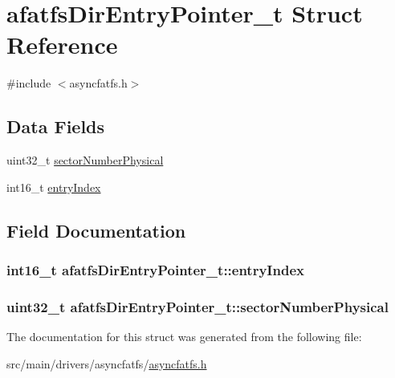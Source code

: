 \hypertarget{structafatfsDirEntryPointer__t}{\section{afatfs\+Dir\+Entry\+Pointer\+\_\+t Struct Reference}
\label{structafatfsDirEntryPointer__t}
}


{\ttfamily \#include $<$asyncfatfs.\+h$>$}

\subsection*{Data Fields}
\begin{DoxyCompactItemize}
\item 
uint32\+\_\+t \hyperlink{structafatfsDirEntryPointer__t_a5700be08a1c9a36c105ca3d246e9b5f3}{sector\+Number\+Physical}
\item 
int16\+\_\+t \hyperlink{structafatfsDirEntryPointer__t_a9eae6ef6291f42cfe22a848f3e6ca11d}{entry\+Index}
\end{DoxyCompactItemize}


\subsection{Field Documentation}
\hypertarget{structafatfsDirEntryPointer__t_a9eae6ef6291f42cfe22a848f3e6ca11d}{
\subsubsection[{entry\+Index}]{\setlength{\rightskip}{0pt plus 5cm}int16\+\_\+t afatfs\+Dir\+Entry\+Pointer\+\_\+t\+::entry\+Index}}\label{structafatfsDirEntryPointer__t_a9eae6ef6291f42cfe22a848f3e6ca11d}
\hypertarget{structafatfsDirEntryPointer__t_a5700be08a1c9a36c105ca3d246e9b5f3}{
\subsubsection[{sector\+Number\+Physical}]{\setlength{\rightskip}{0pt plus 5cm}uint32\+\_\+t afatfs\+Dir\+Entry\+Pointer\+\_\+t\+::sector\+Number\+Physical}}\label{structafatfsDirEntryPointer__t_a5700be08a1c9a36c105ca3d246e9b5f3}


The documentation for this struct was generated from the following file\+:\begin{DoxyCompactItemize}
\item 
src/main/drivers/asyncfatfs/\hyperlink{asyncfatfs_8h}{asyncfatfs.\+h}\end{DoxyCompactItemize}
